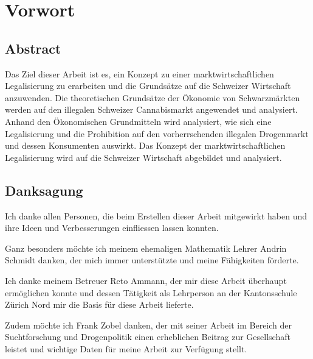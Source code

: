 \documentclass[../main.tex]{subfiles}
\begin{document}
	\section*{Vorwort}
	
	\subsection*{Abstract}
	Das Ziel dieser Arbeit ist es, ein Konzept zu einer marktwirtschaftlichen Legalisierung zu erarbeiten und die Grundsätze auf die Schweizer Wirtschaft anzuwenden. 
	Die theoretischen Grundsätze der Ökonomie von Schwarzmärkten werden auf den illegalen Schweizer Cannabismarkt angewendet und analysiert. Anhand den Ökonomischen Grundmitteln wird analysiert, wie sich eine Legalisierung und die Prohibition auf den vorherrschenden illegalen Drogenmarkt und dessen Konsumenten auswirkt.
	Das Konzept der marktwirtschaftlichen Legalisierung wird auf die Schweizer Wirtschaft abgebildet und analysiert.
	
	
	
	\subsection*{Danksagung}
	Ich danke allen Personen, die beim Erstellen dieser Arbeit mitgewirkt haben und ihre Ideen und Verbesserungen einfliessen lassen konnten.
	
	\noindent
	Ganz besonders möchte ich meinem ehemaligen Mathematik Lehrer Andrin Schmidt danken, der mich immer unterstützte und meine Fähigkeiten förderte.
	
	\noindent
	Ich danke meinem Betreuer Reto Ammann, der mir diese Arbeit überhaupt ermöglichen konnte und dessen Tätigkeit als Lehrperson an der Kantonsschule Zürich Nord mir die Basis für diese Arbeit lieferte.
	
	\noindent
	Zudem möchte ich Frank Zobel danken, der mit seiner Arbeit im Bereich der Suchtforschung und Drogenpolitik einen erheblichen Beitrag zur Gesellschaft leistet und wichtige Daten für meine Arbeit zur Verfügung stellt.
	
\end{document}
